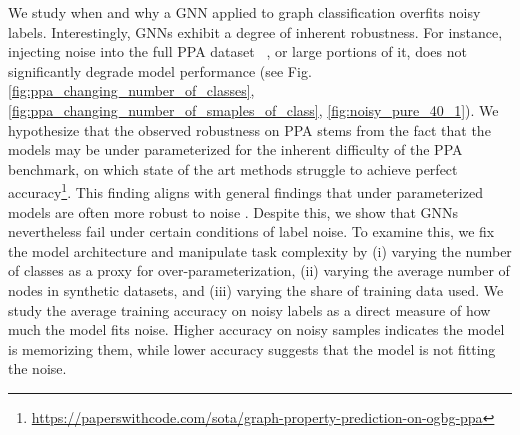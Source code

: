 
We study when and why a GNN applied to graph classification overfits noisy labels.
Interestingly, GNNs exhibit a degree of inherent robustness. For instance, injecting noise into the full PPA  dataset ~\citet{PPA}, or large portions of it, does not significantly degrade model performance (see Fig.  \ref{fig:ppa_changing_number_of_classes}, \ref{fig:ppa_changing_number_of_smaples_of_class}, \ref{fig:noisy_pure_40_1}). 
We hypothesize that the observed robustness on PPA stems from the fact that the models may be under parameterized for the inherent difficulty of the PPA benchmark, on which state of the art methods struggle to achieve perfect accuracy\footnote{\url{https://paperswithcode.com/sota/graph-property-prediction-on-ogbg-ppa}}. This finding aligns with general findings that under parameterized models are often more robust to noise \citep{memorizenoise}.
Despite this, we show that GNNs nevertheless fail under certain conditions of label noise. To examine this, we fix the model architecture and manipulate task complexity by (i) varying the number of classes as a proxy for over-parameterization, (ii) varying the average number of nodes in synthetic datasets, and (iii) varying the share of training data used. We study the average training accuracy on noisy labels as a direct measure of how much the model fits noise. Higher accuracy on noisy samples indicates the model is memorizing them, while lower accuracy suggests that the model is not fitting the noise.

